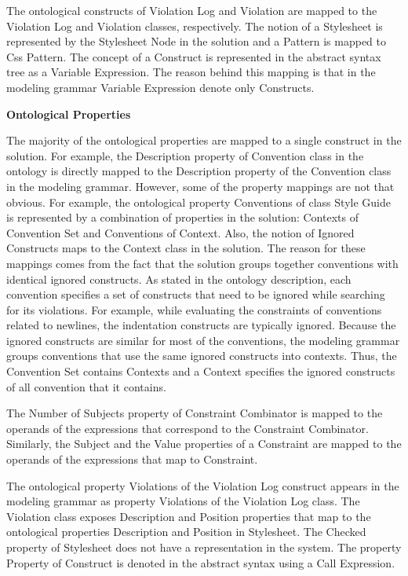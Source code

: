 The ontological constructs of Violation Log and Violation are mapped to the Violation Log and
Violation classes, respectively. The notion of a Stylesheet is represented by the Stylesheet Node in
the solution and a Pattern is mapped to Css Pattern. The concept of a Construct is represented in
the abstract syntax tree as a Variable Expression. The reason behind this mapping is that in the
modeling grammar Variable Expression denote only Constructs.

\textbf{Ontological Properties}

The majority of the ontological properties are mapped to a single construct in the solution. For
example, the Description property of Convention class in the ontology is directly mapped to the
Description property of the Convention class in the modeling grammar. However, some of the property
mappings are not that obvious. For example, the ontological property Conventions of class Style
Guide is represented by a combination of properties in the solution: Contexts of Convention Set and
Conventions of Context. Also, the notion of Ignored Constructs maps to the Context class in the
solution. The reason for these mappings comes from the fact that the solution groups together
conventions with identical ignored constructs. As stated in the ontology description, each
convention specifies a set of constructs that need to be ignored while searching for its violations.
For example, while evaluating the constraints of conventions related to newlines, the indentation
constructs are typically ignored. Because the ignored constructs are similar for most of the
conventions, the modeling grammar groups conventions that use the same ignored constructs into
contexts. Thus, the Convention Set contains Contexts and a Context specifies the ignored constructs
of all convention that it contains.

The Number of Subjects property of Constraint Combinator is mapped to the operands of the
expressions that correspond to the Constraint Combinator. Similarly, the Subject and the Value
properties of a Constraint are mapped to the operands of the expressions that map to Constraint.

The ontological property Violations of the Violation Log construct appears in the modeling grammar
as property Violations of the Violation Log class. The Violation class exposes Description and
Position properties that map to the ontological properties Description and Position in Stylesheet.
The Checked property of Stylesheet does not have a representation in the system. The property
Property of Construct is denoted in the abstract syntax using a Call Expression.


